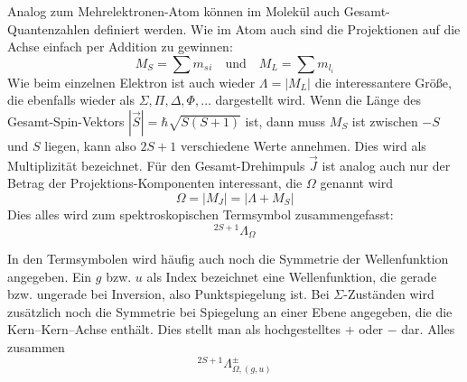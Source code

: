 Analog zum Mehrelektronen-Atom können im Molekül auch Gesamt-Quantenzahlen definiert werden. Wie im Atom auch sind die Projektionen auf die Achse einfach per Addition zu gewinnen:
\begin{equation}
M_S = \sum m_s{_i} \quad \text{und} \quad M_L  = \sum m_{l_i}
\end{equation}
Wie beim einzelnen Elektron ist auch wieder $\Lambda = | M_L|$ die interessantere Größe, die ebenfalls wieder als $\Sigma, \Pi, \Delta, \Phi, \dots$ dargestellt wird. Wenn die Länge des Gesamt-Spin-Vektors $|\vec{S}| = \hbar \sqrt{S (S+1)}$ ist, dann muss  $M_S$ ist zwischen $-S$ und $S$ liegen, kann also  $2S + 1$  verschiedene Werte annehmen. Dies wird als Multiplizität bezeichnet. Für den Gesamt-Drehimpuls $\vec{J}$ ist analog auch nur der Betrag der Projektions-Komponenten interessant, die $\Omega$ genannt wird
\begin{equation}
 \Omega = | M_J | = | \Lambda + M_S|
\end{equation}
Dies alles wird zum spektroskopischen Termsymbol zusammengefasst:
\begin{equation}
 ^{2 S + 1}\Lambda_\Omega
\end{equation}




In den Termsymbolen wird häufig auch noch die Symmetrie der Wellenfunktion angegeben. Ein $g$ bzw. $u$ als Index bezeichnet eine Wellenfunktion, die gerade bzw. ungerade bei Inversion, also Punktspiegelung ist. Bei $\Sigma$-Zuständen wird zusätzlich noch die Symmetrie bei Spiegelung an einer Ebene angegeben, die die Kern--Kern--Achse enthält. Dies stellt man als hochgestelltes $+$ oder $-$ dar.
Alles zusammen
\begin{equation}
 ^{2 S + 1}\Lambda_{\Omega, (g,u)}^\pm
\end{equation}

